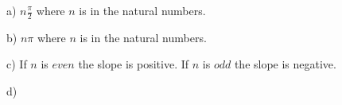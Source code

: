 \documentclass{article}
\begin{document}
a) $n\frac{\pi}{2}$ where $n$ is in the natural numbers.


b) $n\pi$ where $n$ is in the natural numbers.


c) If $n$ is $even$ the slope is positive. If $n$ is $odd$ the slope is negative.

d)
 
\end{document}
